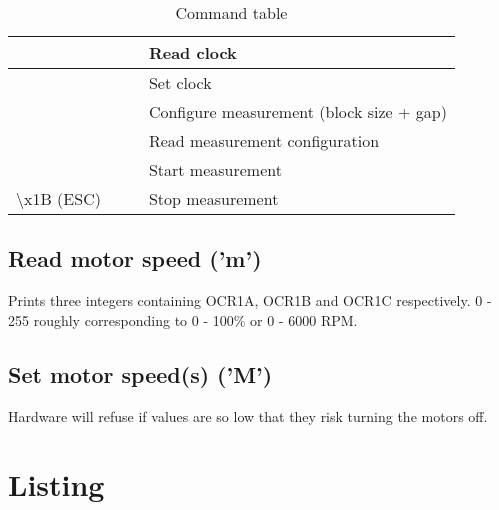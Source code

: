 \documentclass{article}
\begin{document}
\begin{table}[H]
\begin{centering}
\begin{tabular}{|p{1.8cm}|p{1.8cm}|p{1.8cm}|p{5cm}|}
  &   &                     & Read clock \\ \hline
  &   &                     & Set clock \\ \hline
  &   &                     & Configure measurement (block size + gap) \\ \hline
  &   &                     & Read measurement configuration \\ \hline
  &   &                     & Start measurement \\ \hline
{\textbackslash}x1B (ESC)  &   &                     & Stop measurement \\ \hline
\end{tabular}
\caption{Command table}
\label{command_table}
\end{centering}
\end{table}

\subsection{Read motor speed ('m')}

Prints three integers containing OCR1A, OCR1B and OCR1C respectively.
0 - 255 roughly corresponding to 0 - 100\% or 0 - 6000 RPM.

\subsection{Set motor speed(s) ('M')}

Hardware will refuse if values are so low that they risk turning the motors off.

\section{Listing}


\end{document}

